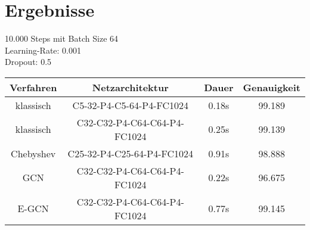 \section{Ergebnisse}
\label{ergebnisse}

10.000 Steps mit Batch Size 64\\
Learning-Rate: 0.001\\
Dropout: 0.5\\

\begin{tabular}{cccc}
  \toprule
  Verfahren & Netzarchitektur & Dauer & Genauigkeit\\
  \midrule
  klassisch & C5-32-P4-C5-64-P4-FC1024 & 0.18s & 99.189\\
  klassisch & C32-C32-P4-C64-C64-P4-FC1024 & 0.25s & 99.139\\
  Chebyshev & C25-32-P4-C25-64-P4-FC1024 & 0.91s & 98.888\\
  GCN & C32-C32-P4-C64-C64-P4-FC1024 & 0.22s & 96.675\\
  E-GCN & C32-C32-P4-C64-C64-P4-FC1024 & 0.77s & 99.145\\
  \bottomrule
\end{tabular}

